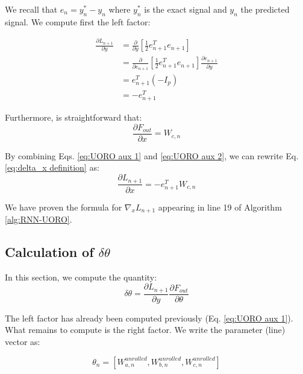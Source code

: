 \documentclass[twocolumn,a4paper]{svjour3} \sloppy          \smartqed
\begin{document}

We recall that $e_n = y_n^* - y_n$ where $y_n^*$ is the exact signal and $y_n$ the predicted signal. We compute first the left factor:

\begin{align}
\frac{\partial L_{n+1}}{\partial y} &= \frac{\partial}{\partial y} \left[ \frac{1}{2} e_{n+1}^T e_{n+1}  \right] \\
&= \frac{\partial}{\partial e_{n+1}} \left[ \frac{1}{2} e_{n+1}^T e_{n+1} \right] \frac{\partial e_{n+1}}{\partial y} \\
&= e_{n+1}^T (-I_p) \\
&= - e_{n+1}^T \label{eq:UORO aux 1}
\end{align}

Furthermore, is straightforward that:
\begin{equation}
\frac{\partial F_{out}}{\partial x} = W_{c,n} \label{eq:UORO aux 2}
\end{equation}

By combining Eqs. \ref{eq:UORO aux 1} and \ref{eq:UORO aux 2}, we can rewrite Eq. \ref{eq:delta_x definition} as:
\begin{equation} \label{eq:delta_x computation result}
\frac{\partial L_{n+1}}{\partial x} = - e_{n+1}^T W_{c,n}
\end{equation}

We have proven the formula for $\nabla_x L_{n+1}$ appearing in line 19 of Algorithm \ref{alg:RNN-UORO}.

\subsection{Calculation of $\delta \theta$}
\label{section: calculation of delta theta}

In this section, we compute the quantity:
\begin{equation} \label{eq:delta theta def}
\delta \theta = \frac{\partial L_{n+1}}{\partial y} \frac{\partial F_{out}}{\partial \theta}
\end{equation} 

The left factor has already been computed previously (Eq. \ref{eq:UORO aux 1}). What remains to compute is the right factor. We write the parameter (line) vector as:

\begin{equation}
\theta_n = [W_{a,n}^{unrolled}, W_{b,n}^{unrolled}, W_{c,n}^{unrolled}]
\end{equation}
\end{document}
